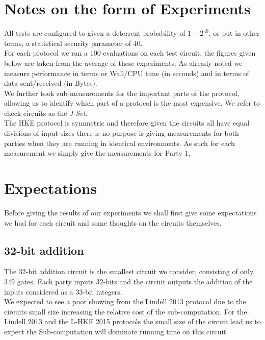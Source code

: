 \documentclass[ %
                    author={Nicholas Tutte},
                supervisor={Prof. Nigel Smart},
                    degree={MEng},
                     title={Secure Two Party Computation},
                  subtitle={A practical comparison of recent protocols},
                      type={Research - GG1K},
                      year={2015} ]{dissertation}
\begin{document}
		\section{Notes on the form of Experiments}
			All tests are configured to given a deterrent probability of $1 - 2^{40}$, or put in other terms, a statistical security parameter of $40$.\\

			For each protocol we ran a 100 evaluations on each test circuit, the figures given below are taken from the average of these experiments. As already noted we measure performance in terms or Wall/CPU time (in seconds) and in terms of data sent/received (in Bytes).\\

			We further took sub-measurements for the important parts of the protocol, allowing us to identify which part of a protocol is the most expensive. We refer to check circuits as the \emph{J-Set}.\\

			The HKE protocol is symmetric and therefore given the circuits all have equal divisions of input sizes there is no purpose is giving measurements for both parties when they are running in identical environments. As such for each measurement we simply give the measurements for Party 1, 


		\section{Expectations}
			Before giving the results of our experiments we shall first give some expectations we had for each circuit and some thoughts on the circuits themselves.

			\subsection{32-bit addition}
				The 32-bit addition circuit is the smallest circuit we consider, consisting of only 349 gates. Each party inputs 32-bits and the circuit outputs the addition of the inputs considered as a 33-bit integers.\\

				We expected to see a poor showing from the Lindell 2013 protocol due to the circuits small size increasing the relative cost of the sub-computation. For the Lindell 2013 and the L-HKE 2015 protocols the small size of the circuit lead us to expect the Sub-computation will dominate running time on this circuit.\\
\end{document}
